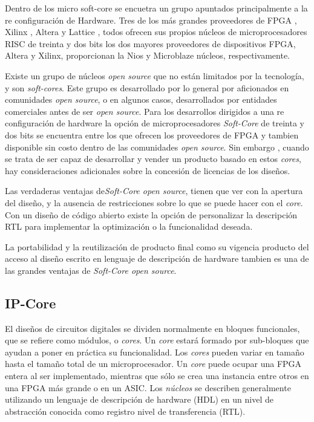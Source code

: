 Dentro de los micro soft-core se encuetra un grupo apuntados principalmente a la re configuración de Hardware.
Tres de los más grandes proveedores de FPGA , Xilinx , Altera y Lattice , todos ofrecen sus propios núcleos de microprocesadores RISC de treinta y dos bits los dos mayores proveedores de dispositivos FPGA, Altera y Xilinx, proporcionan la Nios y Microblaze núcleos, respectivamente.

Existe un grupo de núcleos \textit{open source} que no están limitados por la tecnología, y son \textit{soft-cores}. Este grupo es desarrollado por lo general por aficionados en comunidades \textit{open source}, o en algunos casos, desarrollados por entidades comerciales antes de ser \textit{open source}.
 Para los desarrollos dirigidos a una re configuración de hardware la opción de microprocesadores \textit{Soft-Core} de treinta y dos bits se encuentra entre los que ofrecen los proveedores de FPGA y tambien disponible sin costo dentro de las comunidades \textit{open source}. Sin embargo , cuando se trata de ser capaz de desarrollar y vender un producto basado en estos \textit{cores}, hay consideraciones adicionales sobre la concesión de licencias de los diseños.

Las verdaderas ventajas de\textit{Soft-Core open source}, tienen que ver con la apertura del diseño, y la ausencia de restricciones sobre lo que se puede hacer con el \textit{core}. Con un diseño de código abierto existe la opción de personalizar la descripción RTL para implementar la optimización o la funcionalidad deseada. 

La portabilidad y la reutilización de producto final como su vigencia producto del acceso al diseño escrito en lenguaje de descripción de hardware tambien es una de las grandes ventajas de \textit{Soft-Core open source}.

		
\subsection{ IP-Core}

El diseños de circuitos digitales se dividen normalmente en bloques funcionales, que se refiere como módulos, o \textit{cores}. Un \textit{core} estará formado por sub-bloques que ayudan a poner en práctica su funcionalidad. Los \textit{cores} pueden variar en tamaño hasta el tamaño total de un microprocesador. Un \textit{core} puede ocupar una FPGA entera al ser implementado, mientras que sólo se crea una instancia entre otros en una FPGA más grande o en un ASIC. Los \textit{núcleos} se describen generalmente utilizando un lenguaje de descripción de hardware (HDL) en un nivel de abstracción conocida como registro nivel de transferencia (RTL).

